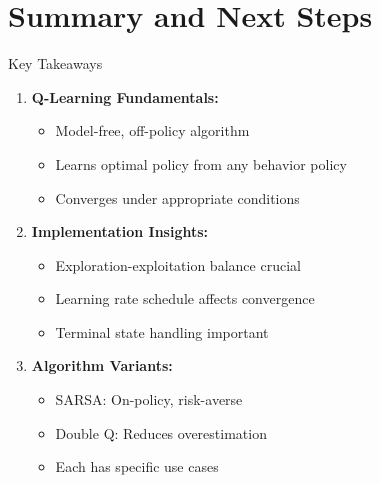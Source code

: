 \documentclass[aspectratio=169,10pt]{beamer}
\begin{document}
\section{Summary and Next Steps}

\begin{frame}{Key Takeaways}
\begin{enumerate}
    \item \textbf{Q-Learning Fundamentals:}
    \begin{itemize}
        \item Model-free, off-policy algorithm
        \item Learns optimal policy from any behavior policy
        \item Converges under appropriate conditions
    \end{itemize}
    
    \item \textbf{Implementation Insights:}
    \begin{itemize}
        \item Exploration-exploitation balance crucial
        \item Learning rate schedule affects convergence
        \item Terminal state handling important
    \end{itemize}
    
    \item \textbf{Algorithm Variants:}
    \begin{itemize}
        \item SARSA: On-policy, risk-averse
        \item Double Q: Reduces overestimation
        \item Each has specific use cases
    \end{itemize}
\end{enumerate}
\end{frame}
\end{document}
